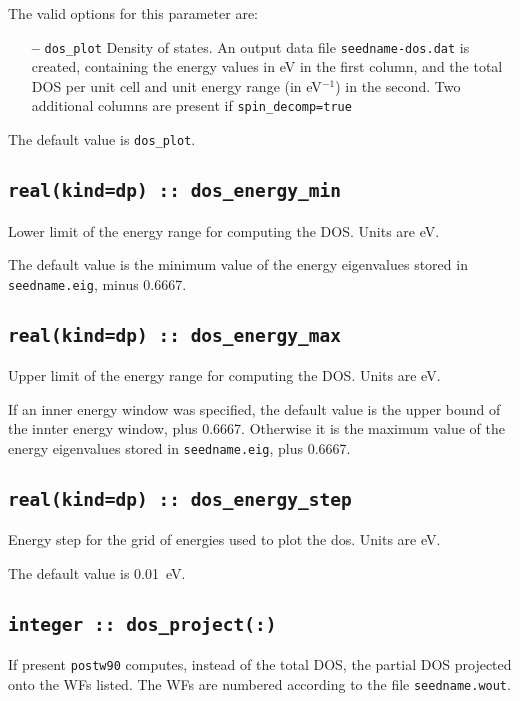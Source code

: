 The valid options for this parameter are:
\begin{itemize}
\item[{\bf --}] \verb#dos_plot# Density of states. An output data file
  {\tt seedname-dos.dat} is created, containing the energy values in
  eV in the first column, and the total DOS per unit cell and unit
  energy range (in eV$^{-1}$) in the second. Two additional columns
  are present if {\tt spin\_decomp=true}
\end{itemize}


The default value is \verb#dos_plot#.


\subsection[dos\_min\_energy]{\tt real(kind=dp) :: dos\_energy\_min}
Lower limit of the energy range for computing the DOS.
Units are eV.

The default value is the minimum value of the energy eigenvalues
stored in {\tt seedname.eig}, minus 0.6667.

\subsection[dos\_max\_energy]{\tt real(kind=dp) :: dos\_energy\_max}
Upper limit of the energy range for computing the DOS.
Units are eV.

If an inner energy window was specified, 
the default value is the upper bound of the innter energy window, plus 0.6667.
Otherwise it is  the maximum value of the energy eigenvalues
stored in {\tt seedname.eig}, plus 0.6667.

\subsection[dos\_energy\_step]{\tt real(kind=dp) :: dos\_energy\_step}
Energy step for the grid of energies used to plot the dos. Units are eV.

The default value is 0.01~eV.

\subsection[dos\_project]{\tt integer :: dos\_project(:)}

If present {\tt postw90} computes, instead of the total DOS, the
partial DOS projected onto the WFs listed. The WFs are numbered
according to the file {\tt seedname.wout}.


